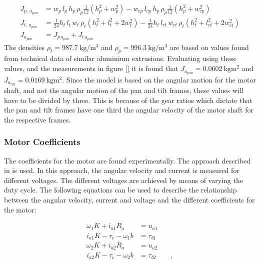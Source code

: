 \documentclass[../../main.tex]{subfiles}
\begin{document}
\begin{equation}\label{eq:pan_axis_inertia}
\begin{split}
        J_{p,\,a_{pan}} &= w_{p}\,l_{p}\,h_{p}\,\rho_{p}\frac{1}{12}(h_{p}^2+w_{p}^2)-w_{cp}\,l_{cp}\,h_{p}\,\rho_{p}\frac{1}{12}(h_{p}^2+w_{cp}^2) \\
        J_{t,\,a_{pan}} &= \frac{1}{24}h_t\,l_t\,w_t\, \rho_t (h_t^2+l_t^2+2w_t^2)-\frac{1}{24}h_t\,l_{ct}\,w_{ct}\, \rho_t (h_t^2+l_{ct}^2+2w_{ct}^2)
        \\
        J_{a_{pan}} &= J_{p\,a_{pan}} + J_{t\,a_{pan}}
\end{split}
\end{equation}
The densities $\rho_t = \SI{987.7 }{\kilo \gram \per \cubic \meter }$ and $\rho_p = \SI{996.3 }{\kilo \gram \per \cubic \meter } $ are based on values found from technical data of similar aluminium extrusions. \cite{extrusion45x45} \cite{extrusion40x40}
Evaluating using these values, and the measurements in figure \ref{} it is found that $J_{a_{pan}} = \SI{0.0602}{\kilo \gram \square \meter } $ and $J_{a_{tilt}} = \SI{0.0169}{\kilo \gram \square \meter }$. Since the model is based on the angular motion for the motor shaft, and not the angular motion of the pan and tilt frames, these values will have to be divided by three. This is because of the gear ratios which dictate that the pan and tilt frames have one third the angular velocity of the motor shaft for the respective frames.

\subsubsection*{ Motor Coefficients }
The coefficients for the motor are found experimentally. The approach described in \cite{PalleAndersenModeldannelse} is used. In this approach, the angular velocity and current is measured for different voltages. The different voltages are achieved by means of varying the duty cycle. The following equations can be used to describe the relationship between the angular velocity, current and voltage and the different coefficients for the motor:


\begin{align*}
    \omega_{1} K + i_{a1} R_{a} &= u_{a1}  \\
    i_{a1} K - \tau_{c} - \omega_{1} b &= \tau_{b1} \\
    \omega_{2} K + i_{a2} R_{a} &= u_{a2} \\
    i_{a2} K - \tau_{c} - \omega_{2} b &= \tau_{b2} \qquad ,
\end{align*}
\end{document}
